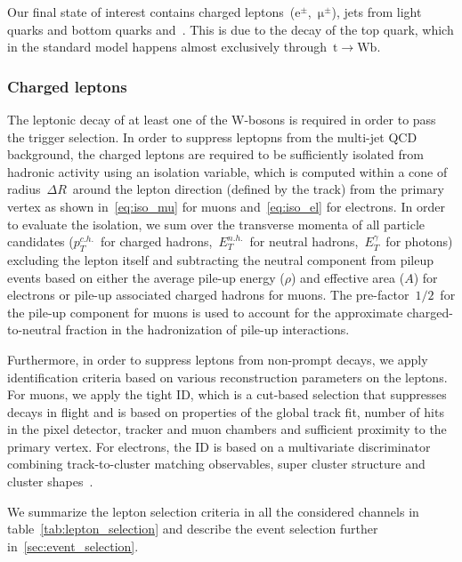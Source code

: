 Our final state of interest contains charged leptons~($\mathrm{e}^\pm$,~$\mathrm{\mu}^\pm$), jets from light quarks and bottom quarks and~\MET. This is due to the decay of the top quark, which in the standard model happens almost exclusively through~$\mathrm{t} \rightarrow \mathrm{W} \mathrm{b}$.

\subsubsection{Charged leptons}
\label{sec:object_id_lep}

The leptonic decay of at least one of the W-bosons is required in order to pass the trigger selection. In order to suppress leptopns from the multi-jet QCD background, the charged leptons are required to be sufficiently isolated from hadronic activity using an isolation variable, which is computed within a cone of radius~$\Delta R$~around the lepton direction (defined by the track) from the primary vertex as shown in~\cref{eq:iso_mu} for muons and~\cref{eq:iso_el} for electrons. In order to evaluate the isolation, we sum over the transverse momenta of all particle candidates ($p_T^{c.h.}$~for charged hadrons,~$E_T^{n.h.}$~for neutral hadrons,~$E_T^{\gamma}$~for photons) excluding the lepton itself and subtracting the neutral component from pileup events based on either the average pile-up energy ($\rho$) and effective area ($A$) for electrons or pile-up associated charged hadrons for muons. The pre-factor~$1/2$~for the pile-up component for muons is used to account for the approximate charged-to-neutral fraction in the hadronization of pile-up interactions\cite{CMS:2012}.

Furthermore, in order to suppress leptons from non-prompt decays, we apply identification criteria based on various reconstruction parameters on the leptons. For muons, we apply the tight ID, which is a cut-based selection that suppresses decays in flight and is based on properties of the global track fit, number of hits in the pixel detector, tracker and muon chambers and sufficient proximity to the primary vertex\cite{Chatrchyan:2012xi,CMS:2017_muon_pog}. For electrons, the ID is based on a multivariate discriminator combining track-to-cluster matching observables, super cluster structure and cluster shapes~\cite{Khachatryan:2015hwa,CMS:2017_egamma_pog}.

We summarize the lepton selection criteria in all the considered channels in table~\cref{tab:lepton_selection} and describe the event selection further in~\cref{sec:event_selection}.

